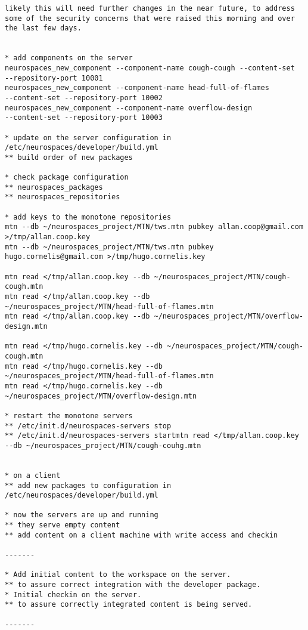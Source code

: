 \documentclass[12pt]{article}
\begin{document}
\begin{verbatim}
likely this will need further changes in the near future, to address
some of the security concerns that were raised this morning and over
the last few days.


* add components on the server
neurospaces_new_component --component-name cough-cough --content-set
--repository-port 10001
neurospaces_new_component --component-name head-full-of-flames
--content-set --repository-port 10002
neurospaces_new_component --component-name overflow-design
--content-set --repository-port 10003

* update on the server configuration in /etc/neurospaces/developer/build.yml
** build order of new packages

* check package configuration
** neurospaces_packages
** neurospaces_repositories

* add keys to the monotone repositories
mtn --db ~/neurospaces_project/MTN/tws.mtn pubkey allan.coop@gmail.com
>/tmp/allan.coop.key
mtn --db ~/neurospaces_project/MTN/tws.mtn pubkey
hugo.cornelis@gmail.com >/tmp/hugo.cornelis.key

mtn read </tmp/allan.coop.key --db ~/neurospaces_project/MTN/cough-cough.mtn
mtn read </tmp/allan.coop.key --db
~/neurospaces_project/MTN/head-full-of-flames.mtn
mtn read </tmp/allan.coop.key --db ~/neurospaces_project/MTN/overflow-design.mtn

mtn read </tmp/hugo.cornelis.key --db ~/neurospaces_project/MTN/cough-cough.mtn
mtn read </tmp/hugo.cornelis.key --db
~/neurospaces_project/MTN/head-full-of-flames.mtn
mtn read </tmp/hugo.cornelis.key --db
~/neurospaces_project/MTN/overflow-design.mtn

* restart the monotone servers
** /etc/init.d/neurospaces-servers stop
** /etc/init.d/neurospaces-servers startmtn read </tmp/allan.coop.key
--db ~/neurospaces_project/MTN/cough-couhg.mtn


* on a client
** add new packages to configuration in /etc/neurospaces/developer/build.yml

* now the servers are up and running
** they serve empty content
** add content on a client machine with write access and checkin

-------

* Add initial content to the workspace on the server.
** to assure correct integration with the developer package.
* Initial checkin on the server.
** to assure correctly integrated content is being served.

-------


\end{verbatim}
\end{document}
